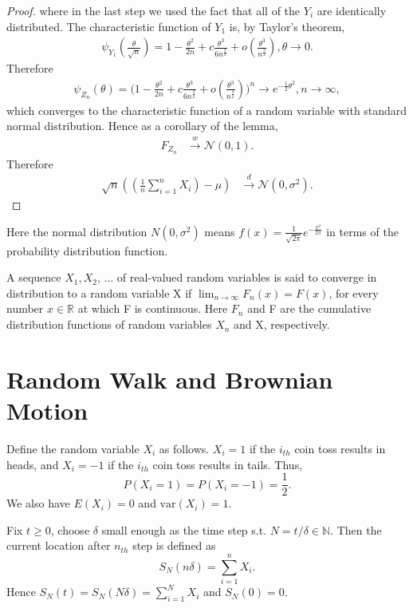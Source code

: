 \begin{proof}
where in the last step we used the fact that all of the $Y_i$ are identically distributed. The characteristic function of $Y_1$ is, by Taylor's theorem,
\begin{align}
\psi_{Y_1}(\frac{\theta}{ \sqrt{n }})=1-\frac{\theta^2}{2n}+c\frac{\theta^3}{6n^{\frac{3}{2}}}+o(\frac{\theta^3}{n^{\frac{3}{2}}}), \theta  \rightarrow 0.
\end{align}
Therefore
\begin{align}
\psi_{Z_n}(\theta)=\bigg ( 1-\frac{\theta^2}{2n}+c\frac{\theta^3}{6n^{\frac{3}{2}}}+o(\frac{\theta^3}{n^{\frac{3}{2}}}) \bigg )^n \rightarrow e^{-\frac{1}{2}\theta^2}, n  \rightarrow \infty,
\end{align}
which converges to the characteristic function of a random variable with standard normal distribution.
Hence as a corollary of the lemma,
\begin{align}
F_{Z_n}&\stackrel{w}{\longrightarrow} \mathcal{N}(0, 1).
\end{align}
Therefore
\begin{align}
\sqrt{n}((\frac{1}{n}\sum_{i=1}^{n}X_i) - \mu)&\stackrel{d}{\longrightarrow} \mathcal{N}(0,\sigma^2).
\end{align}

\end{proof}


Here the normal distribution $N(0,\sigma^2)$ means $f(x)=\frac{1}{\sqrt{2\pi}}e^{-\frac{x^2}{2\pi}}$ in terms of the probability distribution function.

A sequence $X_1, X_2$, ... of real-valued random variables is said to converge in distribution to a random variable X if
$ \lim _{n\to \infty }F_{n}(x)=F(x)$,
for every number $x \in \mathbb{R}$ at which F is continuous. Here $F_n$ and F are the cumulative distribution functions of random variables $X_n$ and X, respectively.

\section{Random Walk and Brownian Motion}

Define the random variable $X_i$ as follows. $X_i=1$ if the $i_{th}$ coin toss results in heads, and $X_i=-1$ if the $i_{th}$ coin toss results in tails. Thus,
\begin{equation}
  P(X_i=1)=P(X_i=-1)=\frac{1}{2}.
\end{equation}
We also have $E(X_i)=0$ and $\mbox{var}(X_i)=1$.

Fix $ t \geq 0$, choose $\delta$ small enough as the time step s.t. $N=t/\delta\in \mathbb{N}$. Then the current location after $n_{th}$ step is defined as
\begin{equation}
  S_N(n \delta)= \sum_{i=1}^{n} X_i.
\end{equation}
Hence $S_N(t)=S_N(N \delta)= \sum_{i=1}^{N} X_i$ and $S_N(0)= 0$.


